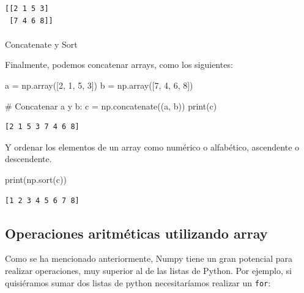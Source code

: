 \documentclass[
  letterpaper,
  DIV=11,
  numbers=noendperiod]{scrreprt}
\makeatletter
\let\oldparagraph\paragraph
\renewcommand{\paragraph}{
    \@ifstar
      \xxxParagraphStar
      \xxxParagraphNoStar
  }
\newcommand{\xxxParagraphStar}[1]{\oldparagraph*{#1}\mbox{}}
\newcommand{\xxxParagraphNoStar}[1]{\oldparagraph{#1}\mbox{}}
\newenvironment{Shaded}{\begin{snugshade}}{\end{snugshade}}
\newcommand{\BuiltInTok}[1]{\textcolor[rgb]{0.00,0.23,0.31}{#1}}
\newcommand{\CommentTok}[1]{\textcolor[rgb]{0.37,0.37,0.37}{#1}}
\newcommand{\DecValTok}[1]{\textcolor[rgb]{0.68,0.00,0.00}{#1}}
\newcommand{\NormalTok}[1]{\textcolor[rgb]{0.00,0.23,0.31}{#1}}
\newcommand{\OperatorTok}[1]{\textcolor[rgb]{0.37,0.37,0.37}{#1}}
\makeatother
\begin{document}
\begin{verbatim}
[[2 1 5 3]
 [7 4 6 8]]
\end{verbatim}

\paragraph{Concatenate y Sort}\label{concatenate-y-sort}

Finalmente, podemos concatenar arrays, como los siguientes:

\begin{Shaded}
\begin{Highlighting}[]
\NormalTok{a }\OperatorTok{=}\NormalTok{ np.array([}\DecValTok{2}\NormalTok{, }\DecValTok{1}\NormalTok{, }\DecValTok{5}\NormalTok{, }\DecValTok{3}\NormalTok{])}
\NormalTok{b }\OperatorTok{=}\NormalTok{ np.array([}\DecValTok{7}\NormalTok{, }\DecValTok{4}\NormalTok{, }\DecValTok{6}\NormalTok{, }\DecValTok{8}\NormalTok{])}

\CommentTok{\# Concatenar a y b:}
\NormalTok{c }\OperatorTok{=}\NormalTok{ np.concatenate((a, b))}
\BuiltInTok{print}\NormalTok{(c)}
\end{Highlighting}
\end{Shaded}

\begin{verbatim}
[2 1 5 3 7 4 6 8]
\end{verbatim}

Y ordenar los elementos de un array como numérico o alfabético,
ascendente o descendente.

\begin{Shaded}
\begin{Highlighting}[]
\BuiltInTok{print}\NormalTok{(np.sort(c))}
\end{Highlighting}
\end{Shaded}

\begin{verbatim}
[1 2 3 4 5 6 7 8]
\end{verbatim}

\subsection{\texorpdfstring{Operaciones aritméticas utilizando
\textbf{array}}{Operaciones aritméticas utilizando array}}\label{operaciones-aritmuxe9ticas-utilizando-array}

Como se ha mencionado anteriormente, Numpy tiene un gran potencial para
realizar operaciones, muy superior al de las listas de Python. Por
ejemplo, si quisiéramos sumar dos listas de python necesitaríamos
realizar un \texttt{for}:
\end{document}
